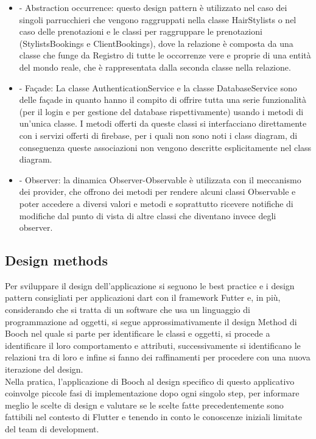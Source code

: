 \documentclass{article}
\begin{document}
\begin{itemize}
    \item -	Abstraction occurrence: questo design pattern è utilizzato nel caso dei singoli parrucchieri che vengono raggruppati nella classe HairStylists o nel caso delle prenotazioni e le classi per raggruppare le prenotazioni (StylistsBookings e ClientBookings), dove la relazione è composta da una classe che funge da Registro di tutte le occorrenze vere e proprie di una entità del mondo reale, che è rappresentata dalla seconda classe nella relazione.
    \item -	Façade: La classe AuthenticationService e la classe DatabaseService sono delle façade in quanto hanno il compito di offrire tutta una serie funzionalità (per il login e per gestione del database rispettivamente) usando i metodi di un'unica classe. I metodi offerti da queste classi si interfacciano direttamente con i servizi offerti di firebase, per i quali non sono noti i class diagram, di conseguenza queste associazioni non vengono descritte esplicitamente nel class diagram.
    \item -	Observer: la dinamica Observer-Observable è utilizzata con il meccanismo dei provider, che offrono dei metodi per rendere alcuni classi Observable e poter accedere a diversi valori e metodi e soprattutto ricevere notifiche di modifiche dal punto di vista di altre classi che diventano invece degli observer.   
\end{itemize} 

\subsection{Design methods}
Per sviluppare il design dell’applicazione si seguono le best practice e i design pattern consigliati per applicazioni dart con il framework Futter e, in più, considerando che si tratta di un software che usa un linguaggio di programmazione ad oggetti, si segue approssimativamente il design Method di Booch nel quale si parte per identificare le classi e oggetti, si procede a identificare il loro comportamento e attributi, successivamente si identificano le relazioni tra di loro e infine si fanno dei raffinamenti per procedere con una nuova iterazione del design. 
\\Nella pratica, l’applicazione di Booch al design specifico di questo applicativo coinvolge piccole fasi di implementazione dopo ogni singolo step, per informare meglio le scelte di design e valutare se le scelte fatte precedentemente sono fattibili nel contesto di Flutter e tenendo in conto le conoscenze iniziali limitate del team di development. 
\end{document}
